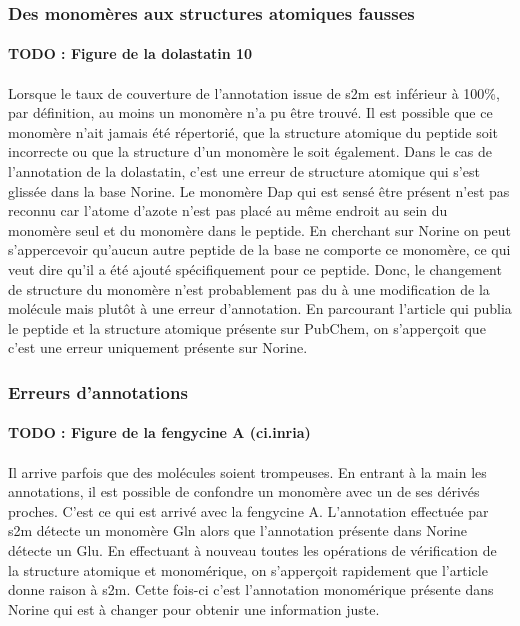 \documentclass[12pt,french,twoside]{report}
\begin{document}
\subsubsection{Des monomères aux structures atomiques fausses}

\label{dolastatin_p}

\paragraph{TODO : Figure de la dolastatin 10}

\paragraph{}Lorsque le taux de couverture de l'annotation issue de s2m est inférieur à 100\%, par définition, au moins un monomère n'a pu être trouvé.
Il est possible que ce monomère n'ait jamais été répertorié, que la structure atomique du peptide soit incorrecte ou que la structure d'un monomère le soit également.
Dans le cas de l'annotation de la dolastatin, c'est une erreur de structure atomique qui s'est glissée dans la base Norine.
Le monomère Dap qui est sensé être présent n'est pas reconnu car l'atome d'azote n'est pas placé au même endroit au sein du monomère seul et du monomère dans le peptide.
En cherchant sur Norine on peut s'appercevoir qu'aucun autre peptide de la base ne comporte ce monomère, ce qui veut dire qu'il a été ajouté spécifiquement pour ce peptide.
Donc, le changement de structure du monomère n'est probablement pas du à une modification de la molécule mais plutôt à une erreur d'annotation.
En parcourant l'article qui publia le peptide et la structure atomique présente sur PubChem, on s'apperçoit que c'est une erreur uniquement présente sur Norine.


\subsubsection{Erreurs d'annotations}

\paragraph{TODO : Figure de la fengycine A (ci.inria)}

\paragraph{}Il arrive parfois que des molécules soient trompeuses.
En entrant à la main les annotations, il est possible de confondre un monomère avec un de ses dérivés proches.
C'est ce qui est arrivé avec la fengycine A.
L'annotation effectuée par s2m détecte un monomère Gln alors que l'annotation présente dans Norine détecte un Glu.
En effectuant à nouveau toutes les opérations de vérification de la structure atomique et monomérique, on s'apperçoit rapidement que l'article donne raison à s2m.
Cette fois-ci c'est l'annotation monomérique présente dans Norine qui est à changer pour obtenir une information juste.
\end{document}
